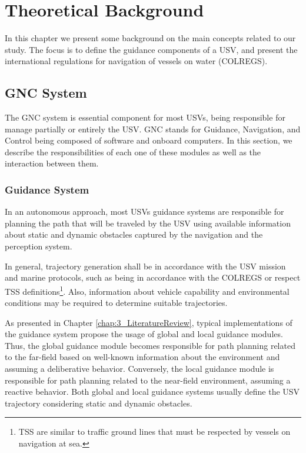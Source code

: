 \chapter{Theoretical Background \label{chap:2_TheoreticalBackground}}


    In this chapter we present some background on the main concepts related to our study. The focus is to define the guidance components of a \ac{USV}, and present the international regulations for navigation of vessels on water (\acs{COLREGS}).

\section{GNC System}
    
    The \acs{GNC} system is essential component for most \acp{USV}, being responsible for manage partially or entirely the \ac{USV}. GNC stands for Guidance, Navigation, and Control being composed of software and onboard computers. In this section, we describe the responsibilities of each one of these modules as well as the interaction between them.
    
    \subsection{Guidance System}

    In an autonomous approach, most \acp{USV} guidance systems are responsible for planning the path that will be traveled by the \ac{USV} using available information about static and dynamic obstacles captured by the navigation and the perception system.

    In general, trajectory generation shall be in accordance with the \ac{USV} mission and marine protocols, such as being in accordance with the \ac{COLREGS} or respect \ac{TSS} definitions\footnote{\ac{TSS} are similar to traffic ground lines that must be respected by vessels on navigation at sea.}. Also, information about vehicle capability and environmental conditions may be required to determine suitable trajectories.
    
    As presented in Chapter \ref{chap:3_LiteratureReview}, typical implementations of the guidance system propose the usage of global and local guidance modules. Thus, the global guidance module becomes responsible for path planning related to the far-field based on well-known information about the environment and assuming a deliberative behavior. Conversely, the local guidance module is responsible for path planning related to the near-field environment, assuming a reactive behavior. Both global and local guidance systems usually define the \ac{USV} trajectory considering static and dynamic obstacles.
    
